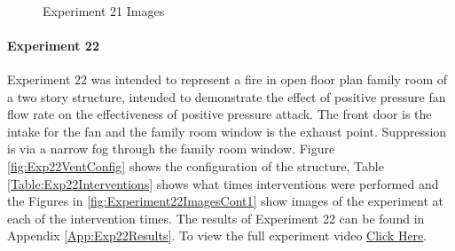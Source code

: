 \documentclass{article}
\begin{document}
\begin{figure}[H]
	\ContinuedFloat 
	\centering 
	 \ 
	\caption{Experiment 21 Images}
	\label{fig:Experiment21ImagesCont3} 
\end{figure}

\paragraph{Experiment 22}\mbox{}

Experiment 22 was intended to represent a fire in open floor plan family room of a two story structure, intended to demonstrate the effect of positive pressure fan flow rate on the effectiveness of positive pressure attack. The front door is the intake for the fan and the family room window is the exhaust point. Suppression is via a narrow fog through the family room window. Figure \ref{fig:Exp22VentConfig} shows the configuration of the structure, Table \ref{Table:Exp22Interventions} shows what times interventions were performed and the Figures in \ref{fig:Experiment22ImagesCont1} show images of the experiment at each of the intervention times. The results of Experiment 22 can be found in Appendix \ref{App:Exp22Results}. To view the full experiment video \href{https://youtu.be/so4YGhws3SY}{Click Here}.
\end{document}
